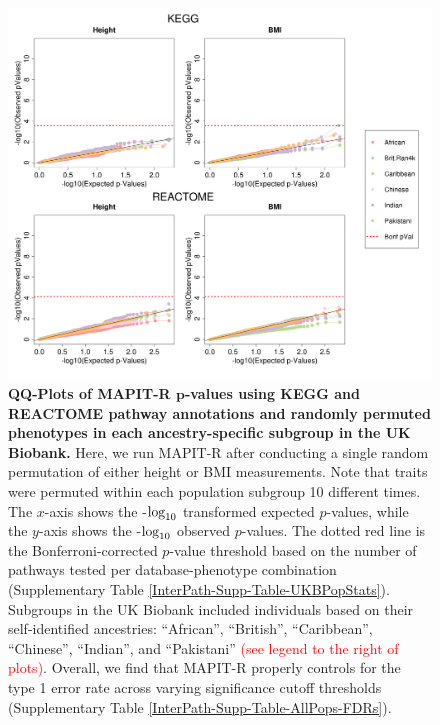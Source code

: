\documentclass[10pt]{article}
\def\log{{\rm log}}
\begin{document}

\begin{figure}[htbp]
\centering
\includegraphics[width = \textwidth]{Images/Supp/InterPath_Supp_Figure_perm1_QQPlots_AllPaths_vs2.png}
\caption{\textbf{QQ-Plots of MAPIT-R $\bm{p}$-values using KEGG and REACTOME pathway annotations and randomly permuted phenotypes in each ancestry-specific subgroup in the UK Biobank.} Here, we run MAPIT-R after conducting a single random permutation of either height or BMI measurements. Note that traits were permuted within each population subgroup 10 different times. The $x$-axis shows the -$\log_{10}$ transformed expected $p$-values, while the $y$-axis shows the -$\log_{10}$ observed $p$-values. The dotted red line is the Bonferroni-corrected $p$-value threshold based on the number of pathways tested per database-phenotype combination (Supplementary Table \ref{InterPath-Supp-Table-UKBPopStats}). Subgroups in the UK Biobank included individuals based on their self-identified ancestries: ``African'', ``British'', ``Caribbean'', ``Chinese'', ``Indian'', and ``Pakistani'' \textcolor{red}{(see legend to the right of plots)}. Overall, we find that MAPIT-R properly controls for the type 1 error rate across varying significance cutoff thresholds (Supplementary Table \ref{InterPath-Supp-Table-AllPops-FDRs}).}
\label{InterPath-Supp-Figure-perm1-QQPlots-AllPaths}
\end{figure}
\clearpage
\end{document}
